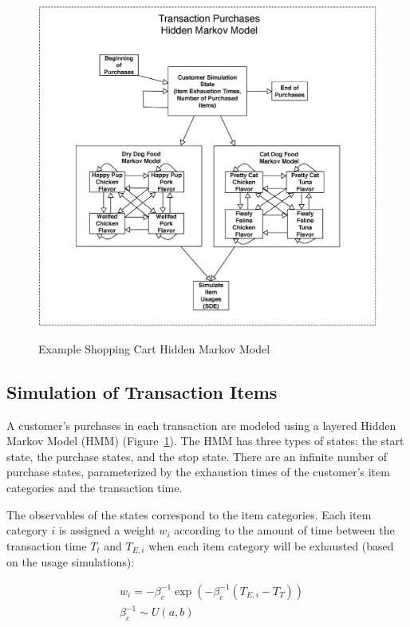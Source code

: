 \begin{figure}[!t]
  \centering
  \caption{Example Shopping Cart Hidden Markov Model}
  \includegraphics[width=6in]{figures/bigpetstore/shopping_cart_simulation.eps}
  \label{fig:shopping_cart_sim}
\end{figure}

\subsection{Simulation of Transaction Items} \label{sec:transaction-purchases}

A customer's purchases in each transaction are modeled using a layered Hidden Markov Model (HMM) (Figure~\ref{fig:shopping_cart_sim}).  The HMM has three types of states: the start state, the purchase states, and the stop state. There are an infinite number of purchase states, parameterized by the exhaustion times of the customer's item categories and the transaction time.

The observables of the states correspond to the item categories.  Each item category $i$ is assigned a weight $w_i$ according to the amount of time between the transaction time $T_t$ and $T_{E,i}$ when each item category will be exhausted (based on the usage simulations):

\begin{align} \label{eq:category-weights}
&w_i = - \beta^{-1}_c \exp(-\beta^{-1}_c (T_{E, i}- T_T)) \\
&\beta^{-1}_c \sim U(a,b) \nonumber
\end{align}

